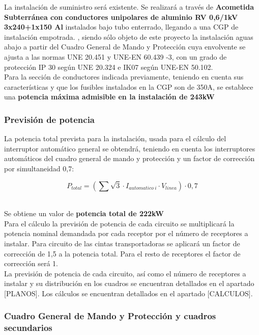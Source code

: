 La instalación de suministro será existente. Se realizará a través de {\bfseries Acometida Subterránea con conductores unipolares de aluminio RV 0,6/1kV 3x240+1x150 Al} instalados bajo tubo enterrado, llegando a una CGP de instalación empotrada. , siendo sólo objeto de este proyecto la instalación aguas abajo a partir del Cuadro General de Mando y Protección cuya envolvente se ajusta a las normas UNE 20.451 y UNE-EN 60.439 -3, con un grado de protección IP 30 según UNE 20.324 e IK07 según UNE-EN 50.102.\\

Para la sección de conductores indicada previamente, teniendo en cuenta sus características y que los fusibles instalados en la CGP son de 350A, se establece una {\bfseries potencia máxima admisible en la instalación de 243kW}

\subsubsection{Previsión de potencia}

La potencia total prevista para la instalación, usada para el cálculo del interruptor automático general se obtendrá, teniendo en cuenta los interruptores automáticos del cuadro general de mando y protección y un factor de corrección por simultaneidad 0,7:

$$P_{total}=\left( \sum \sqrt 3 \cdot I_{automatico\ i}\cdot  {V_{linea}}\right)\cdot 0,7$$\

Se obtiene un valor de {\bfseries potencia total de 222kW}\\

Para el cálculo la previsión de potencia de cada circuito se multiplicará la potencia nominal demandada por cada receptor por el número de receptores a instalar. Para circuito de las cintas transportadoras se aplicará un factor de corrección de 1,5 a la potencia total. Para el resto de receptores el factor de corrección será 1. \\

La previsión de potencia de cada circuito, así como el número de receptores a instalar y su distribución en los cuadros se encuentran detallados en el apartado [PLANOS]. Los cálculos se encuentran detallados en el apartado [CALCULOS]. 

\subsubsection{Cuadro General de Mando y Protección y cuadros secundarios}

